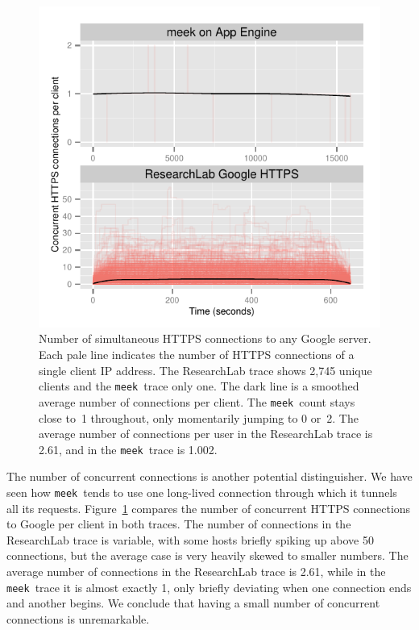 \documentclass[conference]{IEEEtran}
\newcommand{\meek}{\texttt{meek}\xspace}
\newcommand{\lbl}{ResearchLab\xspace}
\begin{document}
\begin{figure}
\centering
\includegraphics[width=\linewidth]{concurrent.pdf}
\caption{
Number of simultaneous HTTPS connections to any Google server.
Each pale line indicates the number of HTTPS connections
of a single client IP address.
The \lbl trace shows 2,745 unique clients and the \meek\ trace only one.
The dark line is a smoothed average number of connections per client.
The \meek\ count stays close to~1 throughout, only momentarily
jumping to 0 or~2.
The average number of connections per user in the \lbl trace is 2.61,
and in the \meek\ trace is 1.002.
}
\label{fig:concurrent}
\end{figure}

The number of concurrent connections is another potential distinguisher.
We have seen how \meek\ tends to use one long-lived connection
through which it tunnels all its requests.
Figure~\ref{fig:concurrent} compares the number of concurrent HTTPS connections to
Google per client in both traces.
The number of connections in the \lbl trace is variable,
with some hosts briefly spiking up above 50 connections,
but the average case is very heavily skewed to smaller numbers.
The average number of connections in the \lbl trace is 2.61,
while in the \meek\ trace it is almost exactly 1, only briefly
deviating when one connection ends and another begins.
We conclude that having a small number of concurrent connections is unremarkable.
\end{document}
